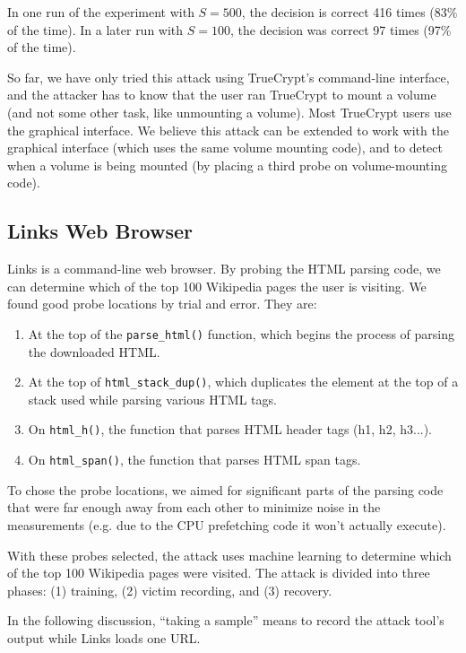 \documentclass{acm_proc_article-sp}
\begin{document}
In one run of the experiment with $S=500$, the decision is correct 416 times
(83\% of the time). In a later run with $S=100$, the decision was correct 97
times (97\% of the time).

So far, we have only tried this attack using TrueCrypt's command-line interface,
and the attacker has to know that the user ran TrueCrypt to mount a volume (and
not some other task, like unmounting a volume). Most TrueCrypt users use the
graphical interface. We believe this attack can be extended to work with the
graphical interface (which uses the same volume mounting code), and to detect
when a volume is being mounted (by placing a third probe on volume-mounting
code).

\subsection{Links Web Browser}

Links is a command-line web browser. By probing the HTML parsing code, we can
determine which of the top 100 Wikipedia pages the user is visiting. We found
good probe locations by trial and error. They are:

\begin{enumerate}
    \item At the top of the \texttt{parse\_html()} function, which begins the
        process of parsing the downloaded HTML.
    \item At the top of \texttt{html\_stack\_dup()}, which duplicates the element
        at the top of a stack used while parsing various HTML tags.
    \item On \texttt{html\_h()}, the function that parses HTML header tags (h1,
        h2, h3...).
    \item On \texttt{html\_span()}, the function that parses HTML span tags.
\end{enumerate}

To chose the probe locations, we aimed for significant parts of the parsing code
that were far enough away from each other to minimize noise in the measurements
(e.g. due to the CPU prefetching code it won't actually execute).

With these probes selected, the attack uses machine learning to determine which
of the top 100 Wikipedia pages were visited. The attack is divided into three
phases: (1) training, (2) victim recording, and (3) recovery.

In the following discussion, ``taking a sample'' means to record the attack
tool's output while Links loads one URL.
\end{document}
